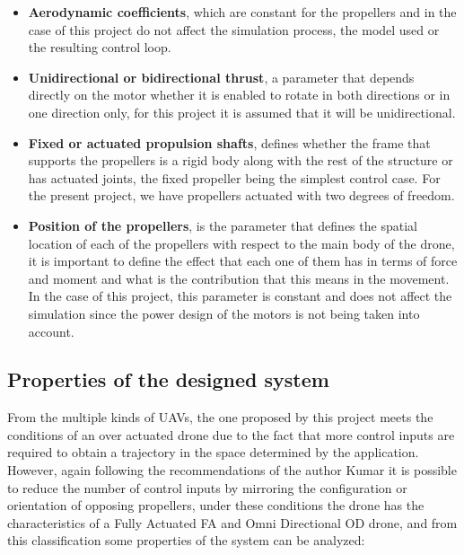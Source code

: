 \documentclass[a4paper, 12pt, oneside]{book}
\begin{document}
\begin{itemize}
    \item \textbf{Aerodynamic coefficients}, which are constant for the propellers and in the case of this project do not affect the simulation process, the model used or the resulting control loop.
    \item \textbf{Unidirectional or bidirectional thrust}, a parameter that depends directly on the motor whether it is enabled to rotate in both directions or in one direction only, for this project it is assumed that it will be unidirectional.
    \item \textbf{Fixed or actuated propulsion shafts}, defines whether the frame that supports the propellers is a rigid body along with the rest of the structure or has actuated joints, the fixed propeller being the simplest control case. For the present project, we have propellers actuated with two degrees of freedom.
    \item \textbf{Position of the propellers}, is the parameter that defines the spatial location of each of the propellers with respect to the main body of the drone, it is important to define the effect that each one of them has in terms of force and moment and what is the contribution that this means in the movement. In the case of this project, this parameter is constant and does not affect the simulation since the power design of the motors is not being taken into account.
\end{itemize}

\subsection{Properties of the designed system}
From the multiple kinds of UAVs, the one proposed by this project meets the conditions of an over actuated drone due to the fact that more control inputs are required to obtain a trajectory in the space determined by the application. However, again following the recommendations of the author Kumar it is possible to reduce the number of control inputs by mirroring the configuration or orientation of opposing propellers, under these conditions the drone has the characteristics of a Fully Actuated FA and Omni Directional OD drone, and from this classification some properties of the system can be analyzed:
\end{document}
